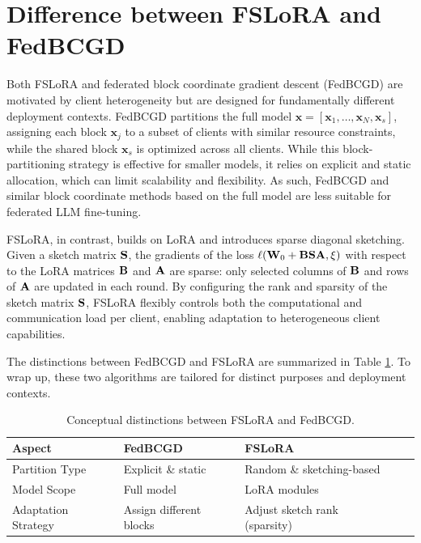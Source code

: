 \documentclass{article} %
\theoremstyle{plain}
\theoremstyle{definition}
\begin{document}
\section{Difference between FSLoRA and FedBCGD}\label{appen:difference_to_fbcgd}


Both FSLoRA and federated block coordinate gradient descent (FedBCGD) \citep{liu2024fedbcgd} are motivated by client heterogeneity but are designed for fundamentally different deployment contexts. FedBCGD partitions the full model $\mathbf{x} = [\mathbf{x}_1, \ldots, \mathbf{x}_N, \mathbf{x}_s]$, assigning each block $\mathbf{x}_j$ to a subset of clients with similar resource constraints, while the shared block $\mathbf{x}_s$ is optimized across all clients. While this block-partitioning strategy is effective for smaller models, it relies on explicit and static allocation, which can limit scalability and flexibility. As such, FedBCGD and similar block coordinate methods based on the full model are less suitable for federated LLM fine-tuning.

FSLoRA, in contrast, builds on LoRA and introduces sparse diagonal sketching. Given a sketch matrix $\bf{S}$, the gradients of the loss $\ell({\bf W}_0 + {\bf BSA}, \xi)$ with respect to the LoRA matrices ${\bf B}$ and ${\bf A}$
are sparse: only selected columns of ${\bf B}$ and rows of ${\bf A}$ are updated in each round.
By configuring the rank and sparsity of the sketch matrix $\bf{S}$, FSLoRA flexibly controls both the computational and communication load per client, enabling adaptation to heterogeneous client capabilities.

The distinctions between FedBCGD and FSLoRA are summarized in Table \ref{conceptual_distinctions}. To wrap up, these two algorithms are tailored for distinct purposes and deployment contexts.

\begin{table}[h]
\caption{
Conceptual distinctions between FSLoRA and FedBCGD.
}
\label{conceptual_distinctions}
\centering
\begin{tabular}{@{}lllll@{}}
\toprule
{Aspect} & {FedBCGD} & {FSLoRA} \\
\midrule
Partition Type & Explicit \& static & Random \& sketching-based \\
Model Scope & Full model & LoRA modules \\
Adaptation Strategy & Assign different blocks & Adjust sketch rank (sparsity) \\
\bottomrule
\end{tabular}
\vspace{-3mm}
\end{table}
\end{document}
